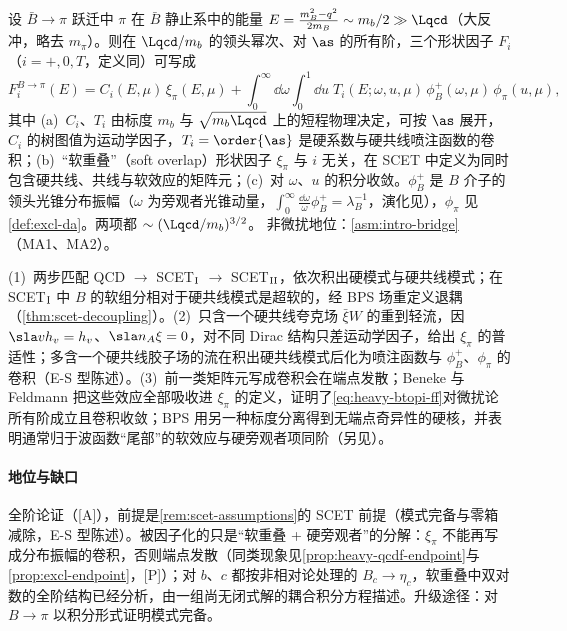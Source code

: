 \begin{proposition}\label{prop:heavy-btopi-ff}
设 $\bar B\to\pi$ 跃迁中 $\pi$ 在 $\bar B$ 静止系中的能量 $E=\frac{m_B^2-q^2}{2m_B}\sim m_b/2\gg\Lqcd$（大反冲，略去 $m_\pi$）。则在 $\Lqcd/m_b$ 的领头幂次、对 $\as$ 的所有阶，三个形状因子 $F_i$（$i=+,0,T$，定义同\cite{Beneke:2003pa}）可写成
\begin{equation}\label{eq:heavy-btopi-ff}
F_i^{B\to\pi}(E)=C_i(E,\mu)\,\xi_\pi(E,\mu)+\int_0^\infty\!\dd\omega\int_0^1\!\dd u\;T_i(E;\omega,u,\mu)\,\phi_B^+(\omega,\mu)\,\phi_\pi(u,\mu),
\end{equation}
其中 (a)~$C_i$、$T_i$ 由标度 $m_b$ 与 $\sqrt{m_b\Lqcd}$ 上的短程物理决定，可按 $\as$ 展开，$C_i$ 的树图值为运动学因子，$T_i=\order{\as}$ 是硬系数与硬共线喷注函数的卷积；(b)~“软重叠”（soft overlap）形状因子 $\xi_\pi$ 与 $i$ 无关，在 SCET 中定义为同时包含硬共线、共线与软效应的矩阵元；(c)~对 $\omega$、$u$ 的积分收敛。$\phi_B^+$ 是 $B$ 介子的领头光锥分布振幅（$\omega$ 为旁观者光锥动量，$\int_0^\infty\frac{\dd\omega}{\omega}\phi_B^+=\lambda_B^{-1}$\cite{Grozin:1996pq}，演化见\cite{Lange:2003ff}），$\phi_\pi$ 见\cref{def:excl-da}。两项都 $\sim(\Lqcd/m_b)^{3/2}$。
非微扰地位：\cref{asm:intro-bridge}（MA1、MA2）。
\end{proposition}

\begin{proofsketch}
(1)~两步匹配 QCD $\to$ SCET$_{\rm I}$ $\to$ SCET$_{\rm II}$，依次积出硬模式与硬共线模式；在 SCET$_{\rm I}$ 中 $B$ 的软组分相对于硬共线模式是超软的，经 BPS 场重定义退耦（\cref{thm:scet-decoupling}）。(2)~只含一个硬共线夸克场 $\bar\xi W$ 的重到轻流，因 $\sla vh_v=h_v$、$\sla n_A\xi=0$，对不同 Dirac 结构只差运动学因子，给出 $\xi_\pi$ 的普适性；多含一个硬共线胶子场的流在积出硬共线模式后化为喷注函数与 $\phi_B^+$、$\phi_\pi$ 的卷积（E-S 型陈述）。(3)~前一类矩阵元写成卷积会在端点发散；Beneke 与 Feldmann 把这些效应全部吸收进 $\xi_\pi$ 的定义，证明了\cref{eq:heavy-btopi-ff}对微扰论所有阶成立且卷积收敛\cite{Beneke:2003pa}；BPS 用另一种标度分离得到无端点奇异性的硬核，并表明通常归于波函数“尾部”的软效应与硬旁观者项同阶\cite{Bauer:2002aj}（另见\cite{Hill:2002vw,Beneke:2005gs}）。
\end{proofsketch}

\paragraph{地位与缺口}
全阶论证（[A]），前提是\cref{rem:scet-assumptions}的 SCET 前提（模式完备与零箱减除，E-S 型陈述）。被因子化的只是“软重叠 + 硬旁观者”的分解：$\xi_\pi$ 不能再写成分布振幅的卷积，否则端点发散（同类现象见\cref{prop:heavy-qcdf-endpoint}与\cref{prop:excl-endpoint}，[P]）；对 $b$、$c$ 都按非相对论处理的 $B_c\to\eta_c$，软重叠中双对数的全阶结构已经分析，由一组尚无闭式解的耦合积分方程描述\cite{Bell:2024bxg}。升级途径：对 $B\to\pi$ 以积分形式证明模式完备。

